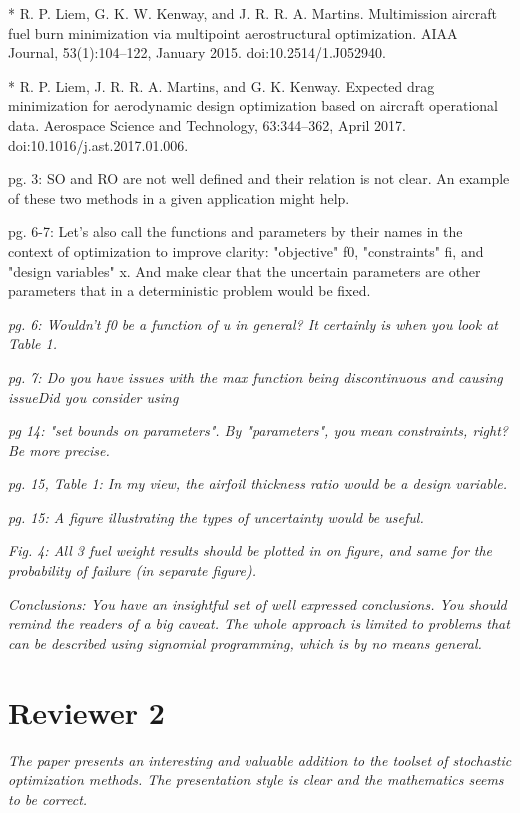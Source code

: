 \documentclass[11pt]{article}
\begin{document}
* R. P. Liem, G. K. W. Kenway, and J. R. R. A. Martins. Multimission aircraft fuel burn minimization via multipoint aerostructural optimization. AIAA Journal, 53(1):104–122, January 2015. doi:10.2514/1.J052940.

* R. P. Liem, J. R. R. A. Martins, and G. K. Kenway. Expected drag minimization for aerodynamic design optimization based on aircraft operational data. Aerospace Science and Technology, 63:344–362, April 2017. doi:10.1016/j.ast.2017.01.006.


pg. 3: SO and RO are not well defined and their relation is not clear. An example of these two methods in a given application might help.

pg. 6-7: Let's also call the functions and parameters by their names in the context of optimization to improve clarity: "objective" f0, "constraints" fi, and "design variables" x. And make clear that the uncertain parameters are other parameters that in a deterministic problem would be fixed.

\textit{pg. 6: Wouldn't f0 be a function of u in general? It certainly is when you look at Table 1.}

\textit{pg. 7: Do you have issues with the max function being discontinuous and causing issueDid you consider using}

\textit{pg 14: "set bounds on parameters". By "parameters", you mean constraints, right? Be more precise.}

\textit{pg. 15, Table 1: In my view, the airfoil thickness ratio would be a design variable.}

\textit{pg. 15: A figure illustrating the types of uncertainty would be useful.}

\textit{Fig. 4: All 3 fuel weight results should be plotted in on figure, and same for the probability of failure (in separate figure).}

\textit{Conclusions: You have an insightful set of well expressed conclusions. You should remind the readers of a big caveat. The whole approach is limited to problems that can be described using signomial programming, which is by no means general.}


\section{Reviewer 2}

\textit{The paper presents an interesting and valuable addition to the toolset of stochastic optimization methods. The presentation style is clear and the mathematics seems to be correct.}
\end{document}
